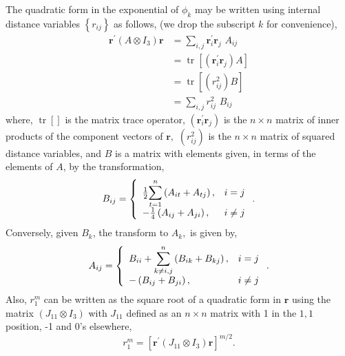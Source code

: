 \documentclass[12pt]{article}
\begin{document}
The quadratic form in the exponential of $\phi_{k}$ may be written using
internal distance variables $\left\{  r_{ij}\right\}  $ as follows, (we drop
the subscript $k$ for convenience),
\begin{align}
\mathbf{r}^{\prime}(A\otimes I_{3})\mathbf{r}  & =\sum_{i,j}\mathbf{r}%
_{i}^{\prime}\mathbf{r}_{j}\,\,A_{ij}\\
& =\operatorname{tr}\left[  \left(  \mathbf{r}_{i}^{\prime}\mathbf{r}%
_{j}\right)  A\right] \\
& =\operatorname{tr}\left[  \left(  r_{ij}^{2}\right)  B\right] \\
& =\sum_{i,j}r_{ij}^{2}\,\,B_{ij}%
\end{align}
where, $\operatorname{tr}\left[  {}\right]  $ is the matrix trace operator,
$\left(  \mathbf{r}_{i}^{\prime}\mathbf{r}_{j}\right)  $ is the $n\times n$
matrix of inner products of the component vectors of $\mathbf{r},$ $\left(
r_{ij}^{2}\right)  $ is the $n\times n$ matrix of squared distance variables,
and $B$ is a matrix with elements given, in terms of the elements of $A$, by
the transformation,
\begin{equation}
B_{ij}=\left\{
\begin{array}
[c]{ll}%
\frac{1}{2}%
{\displaystyle\sum\limits_{t=1}^{n}}
\left(  A_{it}+A_{tj}\right)  , & i=j\\
-\frac{1}{4}\left(  A_{ij}+A_{ji}\right)  , & i\neq j
\end{array}
\right.  .\label{Btran}%
\end{equation}
Conversely, given $B_{k}$, the transform to $A_{k},$ is given by,
\begin{equation}
A_{ij}=\left\{
\begin{array}
[c]{ll}%
B_{ii}+%
{\displaystyle\sum\limits_{k\neq i,j}^{n}}
\left(  B_{ik}+B_{kj}\right)  , & i=j\\
-\left(  B_{ij}+B_{ji}\right)  , & i\neq j
\end{array}
\right.  .\label{Atran}%
\end{equation}
Also, $r_{1}^{m}$ can be written as the square root of a quadratic form in
$\mathbf{r}$ using the matrix $\left(  J_{11}\otimes I_{3}\right)  $ with
$J_{11}$ defined as an $n\times n$ matrix with 1 in the $1,1$ position, -1 and
0's elsewhere\cite{Poshusta83,Kinghorn95a},
\begin{equation}
r_{1}^{m}=\left[  \mathbf{r}^{\prime}(J_{11}\otimes I_{3})\mathbf{r}\right]
^{m/2}.\label{rijJ}%
\end{equation}
\end{document}
